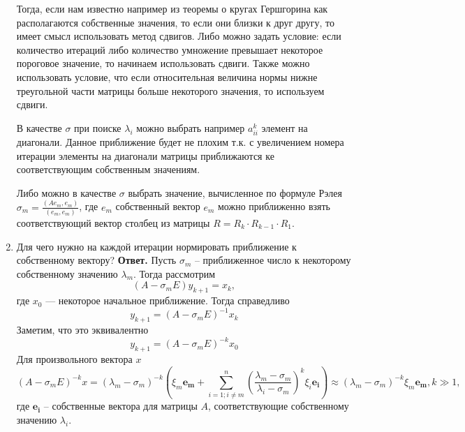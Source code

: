 \documentclass{article}
\begin{document}
\begin{enumerate}
	
	
	Тогда, если нам известно например из теоремы о кругах Гершгорина как располагаются собственные значения, то если они близки к друг другу, то имеет смысл использовать метод сдвигов. Либо можно задать условие: если количество итераций либо количество умножение превышает некоторое пороговое значение, то начинаем использовать сдвиги. Также можно использовать условие, что если относительная величина нормы нижне треугольной части матрицы больше некоторого значения, то используем сдвиги.
	
	
	В качестве $\sigma$ при поиске $\lambda_i$ можно выбрать например $a_{ii}^k$ элемент на диагонали. Данное приближение будет не плохим т.к. с увеличением номера итерации элементы на диагонали матрицы приближаются ке соответствующим собственным значениям.

    
	Либо можно в качестве $\sigma$ выбрать значение, вычисленное по формуле Рэлея $\sigma_m = \frac{(Ae_m,e_m)}{(e_m,e_m)}$, где $e_m$ собственный вектор $e_m$ можно приближенно взять соответствующий вектор столбец из матрицы $R=R_k \cdot R_{k-1} \cdot R_1$. 
        \item Для чего нужно на каждой итерации нормировать приближение к собственному вектору?
        \newline
        {\bfseries Ответ. } 
        Пусть $\sigma_m$ -- приближенное число к некоторому собственному значению $\lambda_m$.
        Тогда рассмотрим 
        \begin{equation*}
            (A - \sigma_m E) y_{k+1} = x_k,
        \end{equation*}
        где $x_0$ --- некоторое начальное приближение.
        Тогда справедливо
        \begin{equation*}
            y_{k+1} = (A - \sigma_m E)^{-1} x_k
        \end{equation*}
        Заметим, что это эквивалентно 
        \begin{equation*}
            y_{k+1} = (A - \sigma_m E)^{-k} x_0
        \end{equation*}
        Для произвольного вектора $x$
        \begin{equation*}
            (A - \sigma_m E)^{-k} x = (\lambda_m - \sigma_m)^{-k} \left(
                \xi_m \boldsymbol{e_m} + \sum_{i=1; i \neq m}^{n} \left(\dfrac{\lambda_m - \sigma_m}{\lambda_i - \sigma_m}\right)^k \xi_i \boldsymbol{e_i}            
            \right) \approx (\lambda_m - \sigma_m)^{-k} \xi_m \boldsymbol{e_m}, k \gg 1 ,
        \end{equation*}
        где $\boldsymbol{e_i}$ -- собственные вектора для матрицы $A$, соответствующие собственному значению $\lambda_i$.


\end{enumerate}
\end{document}
